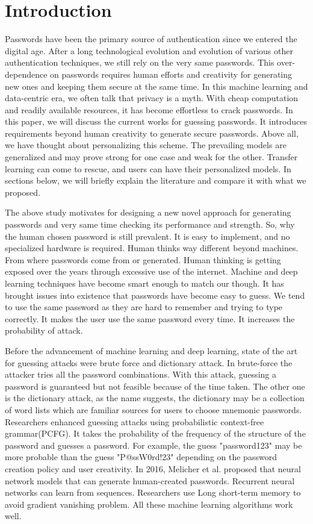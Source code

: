 \documentclass[runningheads]{llncs}
\begin{document}
\section{Introduction}
Passwords have been the primary source of authentication since we entered the digital age. After a long technological evolution and evolution of various other authentication techniques, we still rely on the very same passwords. This over-dependence on passwords requires human efforts and creativity for generating new ones and keeping them secure at the same time. In this machine learning and data-centric era, we often talk that privacy is a myth. With cheap computation and readily available resources, it has become effortless to crack passwords. In this paper, we will discuss the current works for guessing passwords. It introduces requirements beyond human creativity to generate secure passwords. Above all, we have thought about personalizing this scheme. The prevailing models are generalized and may prove strong for one case and weak for the other. Transfer learning can come to rescue, and users can have their personalized models. In sections below, we will briefly explain the literature and compare it with what we proposed.


The above study motivates for designing a new novel approach for generating passwords and very same time checking its performance and strength. So, why the human chosen password is still prevalent. It is easy to implement, and no specialized hardware is required. Human thinks way different beyond machines. From where passwords come from or generated. Human thinking is getting exposed over the years through excessive use of the internet. Machine and deep learning techniques have become smart enough to match our though. It has brought issues into existence that passwords have become easy to guess. We tend to use the same password as they are hard to remember and trying to type correctly. It makes the user use the same password every time. It increases the probability of attack. 

Before the advancement of machine learning and deep learning, state of the art for guessing attacks were brute force and dictionary attack. In brute-force \cite{8400211} the attacker tries all the password combinations. With this attack, guessing a password is guaranteed but not feasible because of the time taken. The other one is the dictionary attack, as the name suggests, the dictionary may be a collection of word lists which are familiar sources for users to choose mnemonic passwords.\cite{8400211} Researchers enhanced guessing attacks using probabilistic context-free grammar(PCFG).\cite{5207658} It takes the probability of the frequency of the structure of the password and guesses a password. For example, the guess "password123" may be more probable than the guess "P@ssW0rd!23" depending on the password creation policy and user creativity. In 2016, Melicher et al. proposed that neural network models that can generate human-created passwords.\cite{197243} Recurrent neural networks can learn from sequences. Researchers use Long short-term memory to avoid gradient vanishing problem. \cite{DBLP:journals/corr/Lipton15} All these machine learning algorithms work well. 
\end{document}
